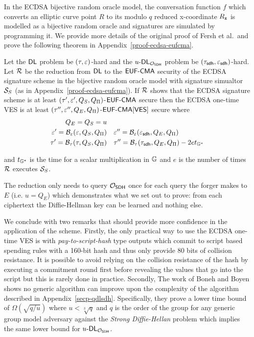 In the ECDSA bijective random oracle model, the conversation function $f$ which converts an elliptic curve point $R$ to its modulo $q$ reduced x-coordinate $R_{\mathtt{x}}$ is modelled as a bijective random oracle and signatures are simulated by programming it.
We provide more details of the original proof of Fersh et al.\ and prove the following theorem in Appendix~\ref{proof-ecdsa-eufcma}.

\begin{theorem}
  Let the $\textsf{DL}$ problem be $(\tau, \varepsilon)$-hard and the $u\text{-}\textsf{DL}_{\mathcal{O}_{\textsf{SDH}}}$ problem be $(\tau_{\textsf{sdh}},\varepsilon_{\textsf{sdh}})$-hard.
  Let $\mathcal{R}$ be the reduction from $\textsf{DL}$ to the $\textsf{EUF-CMA}$ security of the ECDSA signature scheme in the bijective random oracle model with signature simualtor $\mathcal{S}_S$ (as in Appendix~\ref{proof-ecdsa-eufcma}).
  If $\mathcal{R}$ shows that the ECDSA signature scheme is at least $(\tau',\varepsilon',Q_S,Q_{\Pi})$-$\textsf{EUF-CMA}$ secure then the ECDSA one-time VES is at least $(\tau'',\varepsilon'',Q_E,Q_{\Pi})$-$\textsf{EUF-CMA}[\textsf{VES}]$ secure where
  \begin{align*}
    Q_E =  Q_S = u &&& \\
    \varepsilon'   =    \mathcal{B}_\varepsilon(\varepsilon, Q_S, Q_{\Pi})  & & & \varepsilon''  = \mathcal{B}_\varepsilon(\varepsilon_{\textsf{sdh}}, Q_E, Q_{\Pi}) \\
    \tau' =  \mathcal{B}_\tau(\tau,Q_S, Q_{\Pi})  & & & \tau'' = \mathcal{B}_\tau(\tau_{\textsf{sdh}},Q_E, Q_{\Pi}) -  2et_{\mathbb{G}^*}
  \end{align*}

  \hfill \break and $t_{\mathbb{G}^*}$ is the time for a scalar multiplication in $\mathbb{G}$ and $e$ is the number of times $\mathcal{R}$ executes $\mathcal{S}_S$.
\end{theorem}

The reduction only needs to query $\mathcal{O}_{\textsf{SDH}}$ once for each query the forger makes to $E$ (i.e. $u = Q_E$) which demonstrates what we set out to prove: from each ciphertext the Diffie-Hellman key can be learned and nothing else.

We conclude with two remarks that should provide more confidence in the application of the scheme.
Firstly, the only practical way to use the ECDSA one-time VES is with \emph{pay-to-script-hash} type outputs which commit to script based spending rules with a 160-bit hash and thus only provide 80 bits of collision resistance.
It is possible to avoid relying on the collision resistance of the hash by executing a commitment round first before revealing the values that go into the script but this is rarely done in practice.
Secondly, The work of Boneh and Boyen \cite{BBSig} shows no generic algorithm can improve upon the complexity of the algorithm described in Appendix~\ref{secp-qdlsdh}.
Specifically, they prove a lower time bound of $\Omega(\sqrt{q/u})$  where $u < \sqrt[3]{q}$ and $q$ is the order of the group for any generic group model adversary against the \emph{Strong Diffie-Hellan} problem which implies the same lower bound for $u\text{-}\textsf{DL}_{\mathcal{O}_{\textsf{SDH}}}$.
